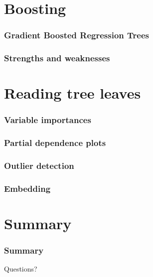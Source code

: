 \documentclass{beamer}
\begin{document}

\section{Boosting}

\begin{frame}
  \frametitle{Gradient Boosted Regression Trees}
\end{frame}

\begin{frame}
  \frametitle{Strengths and weaknesses}
\end{frame}




\section{Reading tree leaves}

\begin{frame}
  \frametitle{Variable importances}
\end{frame}

\begin{frame}
  \frametitle{Partial dependence plots}
\end{frame}

\begin{frame}
  \frametitle{Outlier detection}
\end{frame}

\begin{frame}
  \frametitle{Embedding}
\end{frame}






\section{Summary}

\begin{frame}
  \frametitle{Summary}
\end{frame}

\begin{frame}
\begin{center}
{\Huge  Questions?}
\end{center}
\end{frame}
\end{document}
